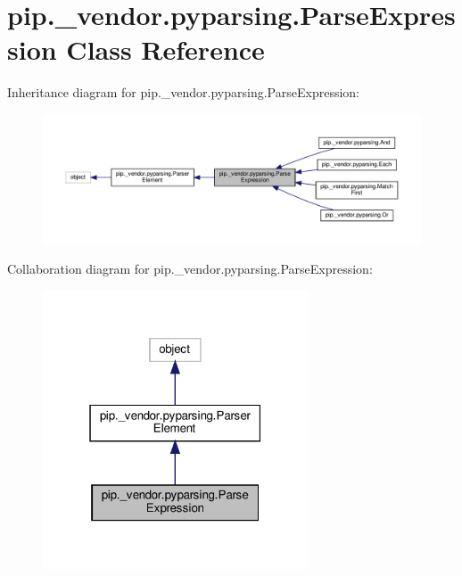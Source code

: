 \hypertarget{classpip_1_1__vendor_1_1pyparsing_1_1ParseExpression}{}\section{pip.\+\_\+vendor.\+pyparsing.\+Parse\+Expression Class Reference}
\label{classpip_1_1__vendor_1_1pyparsing_1_1ParseExpression}


Inheritance diagram for pip.\+\_\+vendor.\+pyparsing.\+Parse\+Expression\+:
\nopagebreak
\begin{figure}[H]
\begin{center}
\leavevmode
\includegraphics[width=350pt]{classpip_1_1__vendor_1_1pyparsing_1_1ParseExpression__inherit__graph}
\end{center}
\end{figure}


Collaboration diagram for pip.\+\_\+vendor.\+pyparsing.\+Parse\+Expression\+:
\nopagebreak
\begin{figure}[H]
\begin{center}
\leavevmode
\includegraphics[width=223pt]{classpip_1_1__vendor_1_1pyparsing_1_1ParseExpression__coll__graph}
\end{center}
\end{figure}
